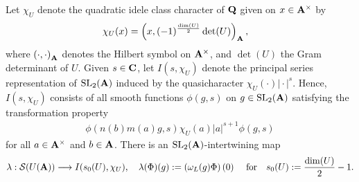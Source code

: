 \documentclass{amsart}
\theoremstyle{definition}
\theoremstyle{definition}
\theoremstyle{definition}
\begin{document}
Let $\chi_U$ denote the quadratic idele class character of ${\bf{Q}}$ given on $x \in {\bf{A}}^{\times}$ by 
\begin{align*} \chi_U(x) &= \left( x, (-1)^{ \frac{ \dim(U) }{2} } \det(U) \right)_{\bf{A}}, \end{align*}
where $\left( \cdot, \cdot \right)_{ \bf{A} }$ denotes the Hilbert symbol on ${\bf{A}}^{\times}$, and $\det(U)$ the Gram determinant of $U$.
Given $s \in {\bf{C}}$, let $I(s, \chi_U)$ denote the principal series representation of $\operatorname{SL}_2({\bf{A}})$
induced by the quasicharacter $\chi_U (\cdot) \vert \cdot \vert^s$. Hence, $I(s, \chi_U)$ consists of all smooth functions
$\phi(g, s)$ on $g \in \operatorname{SL}_2({\bf{A}})$ satisfying the transformation property 
\begin{align*} \phi( n(b) m(a) g, s ) 
\chi_{U}(a) \vert a \vert^{s+1} \phi(g, s)  \end{align*} 
for all $a \in {\bf{A}}^{\times}$ and $b \in {\bf{A}}$. 
There is an $\operatorname{SL}_2({\bf{A}})$-intertwining map 
\begin{align*} \lambda: \mathcal{S}(U({\bf{A}})) 
\longrightarrow I(s_0(U), \chi_U), \quad \lambda(\Phi)(g) := \left( \omega_L(g) \Phi \right)(0)
\quad \text{ for ~~$s_0(U) := \frac{\dim(U)}{2}  -1$}. \end{align*}
\end{document}
